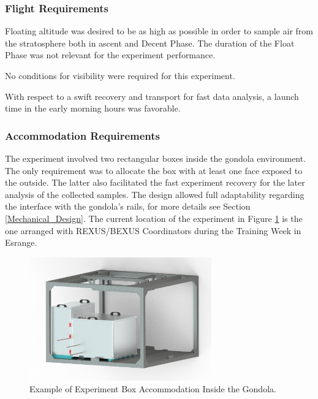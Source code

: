 \subsubsection{Flight Requirements}

Floating altitude was desired to be as high as possible in order to sample air from the stratosphere both in ascent and Decent Phase. The duration of the Float Phase was not relevant for the experiment performance. 

\smallskip
No conditions for visibility were required for this experiment.

\smallskip
With respect to a swift recovery and transport for fast data analysis, a launch time in the early morning hours was favorable.

\pagebreak
\subsubsection{Accommodation Requirements}

The experiment involved two rectangular boxes inside the gondola environment. The only requirement was to allocate the box with at least one face exposed to the outside. The latter also facilitated the fast experiment recovery for the later analysis of the collected samples. The design allowed full adaptability regarding the interface with the gondola's rails, for more details see Section \ref{Mechanical_Design}. The current location of the experiment in Figure \ref{goldola_accommodation} is the one arranged with REXUS/BEXUS Coordinators during the Training Week in Esrange.

\begin{figure}[H]
    \centering
    \includegraphics[width=0.7\textwidth]{6-launch-campaign-preparation/img/Figure_49_Gondola.png}
    \caption{Example of Experiment Box Accommodation Inside the Gondola.}
    \label{goldola_accommodation}
\end{figure}